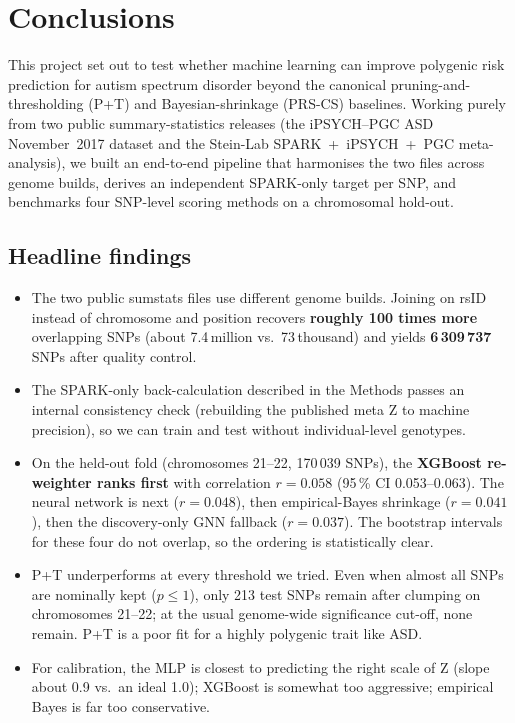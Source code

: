 \section{Conclusions}
\label{sec:conclusions}

This project set out to test whether machine learning can improve
polygenic risk prediction for autism spectrum disorder beyond the
canonical pruning-and-thresholding (P+T) and Bayesian-shrinkage
(PRS-CS) baselines. Working purely from two public summary-statistics
releases (the iPSYCH--PGC ASD November~2017 dataset and the Stein-Lab
SPARK~+~iPSYCH~+~PGC meta-analysis), we built an end-to-end pipeline
that harmonises the two files across genome builds, derives an
independent SPARK-only target per SNP, and benchmarks four SNP-level
scoring methods on a chromosomal hold-out.

\subsection{Headline findings}

\begin{itemize}[leftmargin=1.4em]
  \item The two public sumstats files use different genome builds.
        Joining on rsID instead of chromosome and position recovers
        \textbf{roughly 100 times more} overlapping SNPs (about
        7.4\,million vs.\ 73\,thousand) and yields \textbf{6\,309\,737}
        SNPs after quality control.
  \item The SPARK-only back-calculation described in the Methods
        passes an internal consistency check (rebuilding the published
        meta Z to machine precision), so we can train and test without
        individual-level genotypes.
  \item On the held-out fold (chromosomes 21--22, 170\,039 SNPs), the
        \textbf{XGBoost re-weighter ranks first} with correlation
        $r = 0.058$ (95\,\% CI 0.053--0.063). The neural network is
        next ($r = 0.048$), then empirical-Bayes shrinkage ($r =
        0.041$), then the discovery-only GNN fallback ($r = 0.037$).
        The bootstrap intervals for these four do not overlap, so the
        ordering is statistically clear.
  \item P+T underperforms at every threshold we tried. Even when almost
        all SNPs are nominally kept ($p \leq 1$), only 213 test
        SNPs remain after clumping on chromosomes 21--22; at the usual
        genome-wide significance cut-off, none remain. P+T is a poor
        fit for a highly polygenic trait like ASD.
  \item For calibration, the MLP is closest to predicting the right
        scale of Z (slope about 0.9 vs.\ an ideal 1.0); XGBoost is
        somewhat too aggressive; empirical Bayes is far too conservative.
\end{itemize}

